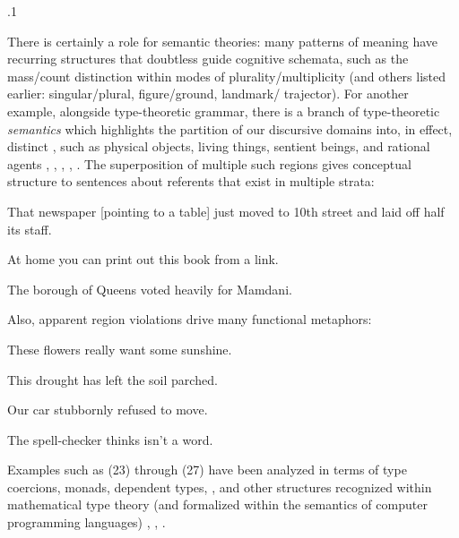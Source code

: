 \documentclass[11pt, twocolumn]{article}
\begin{document}
\p.1{%
\:\+There is certainly a role for semantic theories:
many patterns of meaning have recurring structures
that doubtless guide cognitive schemata,
such as the mass/count distinction within modes
of plurality/multiplicity (and others listed earlier:
singular/plural, figure/ground, landmark/ trajector). \> 
For another example, alongside type-theoretic
grammar, there is a branch of type-theoretic
\textit{semantics} which highlights the partition
of our discursive domains into, in effect,
distinct , such as
physical objects, living things, sentient
beings, and rational agents , ,
, ,
. \>  The superposition of
multiple such regions gives conceptual structure
to sentences about referents that exist in multiple strata:

\begin{exsGroup}

\exsItem{}  \>  That newspaper [pointing to a table] just moved to 10th street
and laid off half its staff.\vspace{1pt} \> 

\exsItem{}  \>  At home you can print out this book from a  link.\upAdj{12pt} \> 

\exsItem{}  \>  The borough of Queens voted heavily for Mamdani.\upAdj{12pt} \> 

\end{exsGroup}

\nip{}%
Also, apparent region violations drive many functional metaphors:

\begin{exsGroup}

\exsItem{}  \>  These flowers really want some sunshine. \> 

\exsItem{}  \>  This drought has left the soil parched. \> 

\exsItem{}  \>  Our car stubbornly refused to move. \> 

\exsItem{}  \>  The spell-checker thinks  isn't a word.\vspace{2pt}

\end{exsGroup}

\nip{}%
Examples such as \exsRef(23) through \exsRef(27) have been analyzed in terms of
type coercions, monads, dependent types, , and
other structures recognized within mathematical type theory (and
formalized within the semantics of computer programming languages)
, , .\<\;
}%
\end{document}
